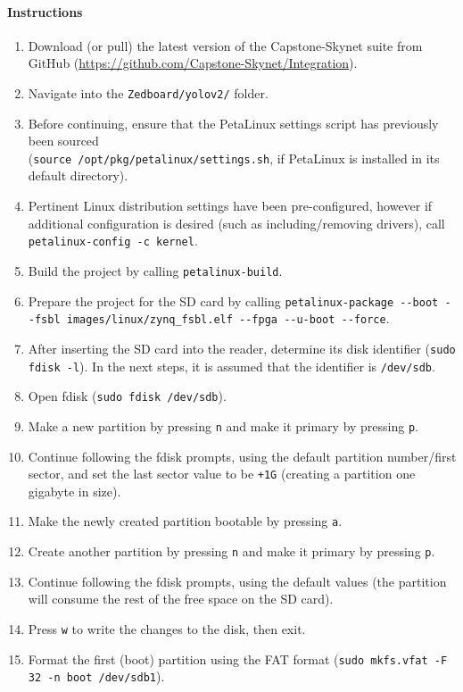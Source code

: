 \documentclass[10pt,letterpaper]{article}
\begin{document}
\paragraph{Instructions}
\begin{enumerate}
\item Download (or pull) the latest version of the Capstone-Skynet suite from GitHub (\url{https://github.com/Capstone-Skynet/Integration}).
\item Navigate into the \texttt{Zedboard/yolov2/} folder. 
\item Before continuing, ensure that the PetaLinux settings script has previously been sourced\\ (\texttt{source /opt/pkg/petalinux/settings.sh}, if PetaLinux is installed in its default directory).
\item Pertinent Linux distribution settings have been pre-configured, however if additional configuration is desired (such as including/removing drivers), call \texttt{petalinux-config -c kernel}.
\item Build the project by calling \texttt{petalinux-build}.
\item Prepare the project for the SD card by calling \texttt{petalinux-package -{}-boot -{}-fsbl images/linux/zynq\_fsbl.elf -{}-fpga -{}-u-boot -{}-force}.
\item After inserting the SD card into the reader, determine its disk identifier (\texttt{sudo fdisk -l}). In the next steps, it is assumed that the identifier is \texttt{/dev/sdb}.
\item Open fdisk (\texttt{sudo fdisk /dev/sdb}).
\item Make a new partition by pressing \texttt{n} and make it primary by pressing \texttt{p}.
\item Continue following the fdisk prompts, using the default partition number/first sector, and set the last sector value to be \texttt{+1G} (creating a partition one gigabyte in size).
\item Make the newly created partition bootable by pressing \texttt{a}.
\item Create another partition by pressing \texttt{n} and make it primary by pressing \texttt{p}.
\item Continue following the fdisk prompts, using the default values (the partition will consume the rest of the free space on the SD card).
\item Press \texttt{w} to write the changes to the disk, then exit.
\item Format the first (boot) partition using the FAT format (\texttt{sudo mkfs.vfat -F 32 -n boot /dev/sdb1}).

\end{enumerate}
\end{document}
